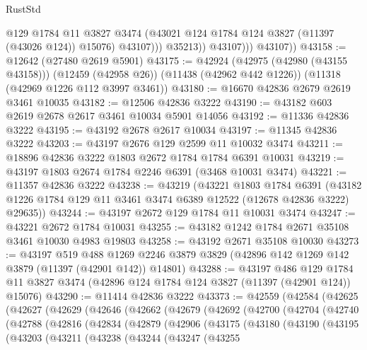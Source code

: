 \begin{lexlean}{RustStd}
\begin{coremodule}
                        @129
                        @1784
                        @11
                        @3827
                        @3474
                        (@43021 @124 @1784 @124 @3827 (@11397 (@43026 @124)) @15076)
                        @43107)))
                  @35213))
              @43107)))
        @43107))
@43158 := @12642 (@27480 @2619 @5901)
@43175 := @42924
    (@42975 (@42980 (@43155 @43158)))
    (@12459 (@42958 @26))
    (@11438 (@42962 @442 @1226))
    (@11318 (@42969 @1226 @112 @3997 @3461))
@43180 := @16670 @42836 @2679 @2619 @3461 @10035
@43182 := @12506 @42836 @3222
@43190 := @43182 @603 @2619 @2678 @2617 @3461 @10034 @5901 @14056
@43192 := @11336 @42836 @3222
@43195 := @43192 @2678 @2617 @10034
@43197 := @11345 @42836 @3222
@43203 := @43197 @2676 @129 @2599 @11 @10032 @3474
@43211 := @18896 @42836 @3222 @1803 @2672 @1784 @1784 @6391 @10031
@43219 := @43197 @1803 @2674 @1784 @2246 @6391 (@3468 @10031 @3474)
@43221 := @11357 @42836 @3222
@43238 := @43219
    (@43221
      @1803
      @1784
      @6391
      (@43182 @1226 @1784 @129 @11 @3461 @3474 @6389 @12522 (@12678 @42836 @3222) @29635))
@43244 := @43197 @2672 @129 @1784 @11 @10031 @3474
@43247 := @43221 @2672 @1784 @10031
@43255 := @43182 @1242 @1784 @2671 @35108 @3461 @10030 @4983 @19803
@43258 := @43192 @2671 @35108 @10030
@43273 := @43197
    @519
    @488
    @1269
    @2246
    @3879
    @3829
    (@42896 @142 @1269 @142 @3879 (@11397 (@42901 @142)) @14801)
@43288 := @43197
    @486
    @129
    @1784
    @11
    @3827
    @3474
    (@42896 @124 @1784 @124 @3827 (@11397 (@42901 @124)) @15076)
@43290 := @11414 @42836 @3222
@43373 := @42559
    (@42584
      (@42625
        (@42627
          (@42629
            (@42646
              (@42662
                (@42679
                  (@42692
                    (@42700
                      (@42704
                        (@42740
                          (@42788
                            (@42816
                              (@42834
                                (@42879
                                  (@42906
                                    (@43175
                                      (@43180
                                        (@43190
                                          (@43195
                                            (@43203
                                              (@43211
                                                (@43238
                                                  (@43244
                                                    (@43247
                                                      (@43255

\end{coremodule}
\end{lexlean}
